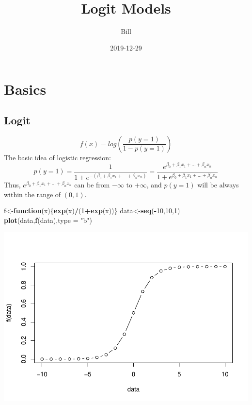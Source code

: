 \documentclass[]{book}
\title{Logit Models}
\author{Bill}
\date{2019-12-29}
\newenvironment{Shaded}{\begin{snugshade}}{\end{snugshade}}
\newcommand{\KeywordTok}[1]{\textcolor[rgb]{0.13,0.29,0.53}{\textbf{#1}}}
\newcommand{\DataTypeTok}[1]{\textcolor[rgb]{0.13,0.29,0.53}{#1}}
\newcommand{\DecValTok}[1]{\textcolor[rgb]{0.00,0.00,0.81}{#1}}
\newcommand{\StringTok}[1]{\textcolor[rgb]{0.31,0.60,0.02}{#1}}
\newcommand{\ControlFlowTok}[1]{\textcolor[rgb]{0.13,0.29,0.53}{\textbf{#1}}}
\newcommand{\OperatorTok}[1]{\textcolor[rgb]{0.81,0.36,0.00}{\textbf{#1}}}
\newcommand{\NormalTok}[1]{#1}
\begin{document}
\maketitle

{
\setcounter{tocdepth}{1}
\tableofcontents
}
\chapter{Basics}\label{basics}

\section{Logit}\label{logit}

\[f(x)=log(\frac{p(y=1)}{1-p(y=1)})\] The basic idea of logistic
regression:
\[p(y=1)=\frac{1}{1+e^{-(\beta_0+\beta_1x_1+...+\beta_nx_n)}}=\frac{e^{\beta_0+\beta_1x_1+...+\beta_nx_n}}{1+e^{\beta_0+\beta_1x_1+...+\beta_nx_n}}\]
Thus, \(e^{\beta_0+\beta_1x_1+...+\beta_nx_n}\) can be from \(-\infty\)
to \(+\infty\), and \(p(y=1)\) will be always within the range of
\((0,1)\).

\begin{Shaded}
\begin{Highlighting}[]
\NormalTok{f<-}\ControlFlowTok{function}\NormalTok{(x)\{}\KeywordTok{exp}\NormalTok{(x)}\OperatorTok{/}\NormalTok{(}\DecValTok{1}\OperatorTok{+}\KeywordTok{exp}\NormalTok{(x))\}}
\NormalTok{data<-}\KeywordTok{seq}\NormalTok{(}\OperatorTok{-}\DecValTok{10}\NormalTok{,}\DecValTok{10}\NormalTok{,}\DecValTok{1}\NormalTok{)}
\KeywordTok{plot}\NormalTok{(data,}\KeywordTok{f}\NormalTok{(data),}\DataTypeTok{type =} \StringTok{"b"}\NormalTok{)}
\end{Highlighting}
\end{Shaded}

\includegraphics{bookdown-demo_files/figure-latex/unnamed-chunk-1-1.pdf}
\end{document}
